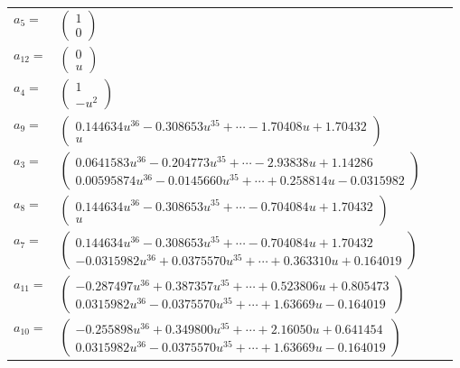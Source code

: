 \documentclass[1p]{elsarticle_modified}
\theoremstyle{definition}
\begin{document}
\begin{tabular}{m{7pt} m{180pt} m{7pt} m{180pt} }
\flushright $a_{5}=$&$\begin{pmatrix}1\\0\end{pmatrix}$ \\
\flushright $a_{12}=$&$\begin{pmatrix}0\\u\end{pmatrix}$ \\
\flushright $a_{4}=$&$\begin{pmatrix}1\\- u^2\end{pmatrix}$ \\
\flushright $a_{9}=$&$\begin{pmatrix}0.144634 u^{36}-0.308653 u^{35}+\cdots-1.70408 u+1.70432\\u\end{pmatrix}$ \\
\flushright $a_{3}=$&$\begin{pmatrix}0.0641583 u^{36}-0.204773 u^{35}+\cdots-2.93838 u+1.14286\\0.00595874 u^{36}-0.0145660 u^{35}+\cdots+0.258814 u-0.0315982\end{pmatrix}$ \\
\flushright $a_{8}=$&$\begin{pmatrix}0.144634 u^{36}-0.308653 u^{35}+\cdots-0.704084 u+1.70432\\u\end{pmatrix}$ \\
\flushright $a_{7}=$&$\begin{pmatrix}0.144634 u^{36}-0.308653 u^{35}+\cdots-0.704084 u+1.70432\\-0.0315982 u^{36}+0.0375570 u^{35}+\cdots+0.363310 u+0.164019\end{pmatrix}$ \\
\flushright $a_{11}=$&$\begin{pmatrix}-0.287497 u^{36}+0.387357 u^{35}+\cdots+0.523806 u+0.805473\\0.0315982 u^{36}-0.0375570 u^{35}+\cdots+1.63669 u-0.164019\end{pmatrix}$ \\
\flushright $a_{10}=$&$\begin{pmatrix}-0.255898 u^{36}+0.349800 u^{35}+\cdots+2.16050 u+0.641454\\0.0315982 u^{36}-0.0375570 u^{35}+\cdots+1.63669 u-0.164019\end{pmatrix}$ \\

\end{tabular}
\end{document}

